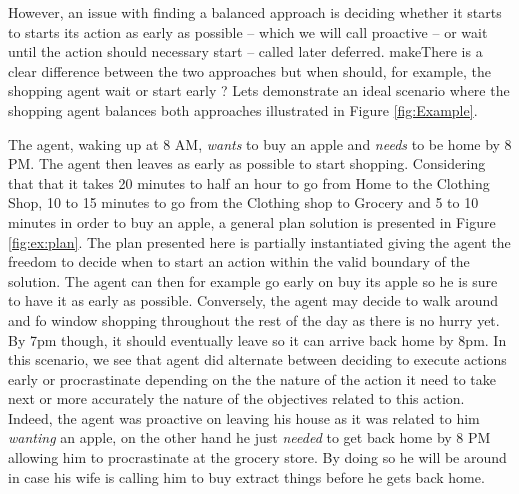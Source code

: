 However, an issue with finding a balanced approach is deciding whether
it starts to starts its action as early as possible -- which we will
call proactive 
-- or wait until the action should necessary start --
called later deferred. 
makeThere is a clear difference between the two approaches
 but when should, for example, the shopping agent wait
or start early ? Lets demonstrate an ideal scenario where the shopping
agent balances both approaches illustrated in Figure \ref{fig:Example}. 

The agent, waking up at 8 AM, {\em wants} to buy an apple
and {\em needs} to be home by 8 PM. The agent then leaves as early as
possible to start shopping. Considering that that it takes 20 minutes
to half an hour to go from Home to the Clothing Shop, 10 to 15 minutes
to go from the Clothing shop to Grocery and 5 to 10 minutes in order
to buy an apple, a general plan solution is presented in  Figure
\ref{fig:ex:plan}. The plan presented here is partially instantiated
giving the agent the freedom to decide when to start an action within
the valid boundary of the solution. The agent can then for example go
early on buy its apple so he is sure to have it as early as possible. Conversely,
the agent may decide to walk around and fo window shopping throughout
the rest of the day as there is no hurry yet. By 7pm though, it should
eventually leave so it can arrive back home by 8pm. In this scenario,
we see that agent did alternate between deciding to execute actions
early or procrastinate depending on the the nature of the action it
need to take next or more accurately the nature of the objectives 
related to this action. Indeed, the agent was proactive on leaving his 
house as it was related to him {\em
  wanting}  an apple, on the other hand he just {\em needed} to get
back home by 8 PM allowing him to procrastinate at the grocery 
store. By doing so he will be around in case his wife is calling him
to buy extract things before he gets back home. 



